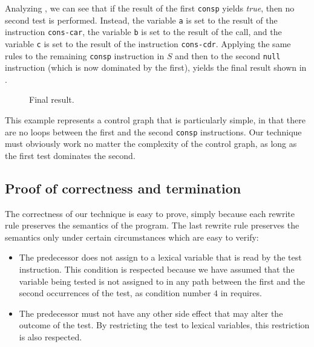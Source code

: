 Analyzing , we can see that if the result of the
first \texttt{consp} yields \emph{true}, then no second test is
performed.  Instead, the variable \texttt{a} is set to the result of
the instruction \texttt{cons-car}, the variable \texttt{b} is set to
the result of the call, and the variable \texttt{c} is set to the
result of the instruction \texttt{cons-cdr}.  Applying the same rules
to the remaining \texttt{consp} instruction in $S$ and then to the
second \texttt{null} instruction (which is now dominated by the
first), yields the final result shown in  .

\begin{figure}
\begin{center}
\end{center}
\caption{\label{fig-rewrite-8}
Final result.}
\end{figure}

This example represents a control graph that is particularly simple,
in that there are no loops between the first and the second
\texttt{consp} instructions.  Our technique must obviously work no
matter the complexity of the control graph, as long as the first test
dominates the second.

\subsection{Proof of correctness and termination}

The correctness of our technique is easy to prove, simply because each
rewrite rule preserves the semantics of the program.  The last rewrite
rule preserves the semantics only under certain circumstances which
are easy to verify:

\begin{itemize}
\item The predecessor does not assign to a lexical variable that is
  read by the test instruction.  This condition is respected because
  we have assumed that the variable being tested is not assigned to
  in any path between the first and the second occurrences of the
  test, as condition number $4$ in
   requires.
\item The predecessor must not have any other side effect that may
  alter the outcome of the test.  By restricting the test to lexical
  variables, this restriction is also respected.
\end{itemize}

